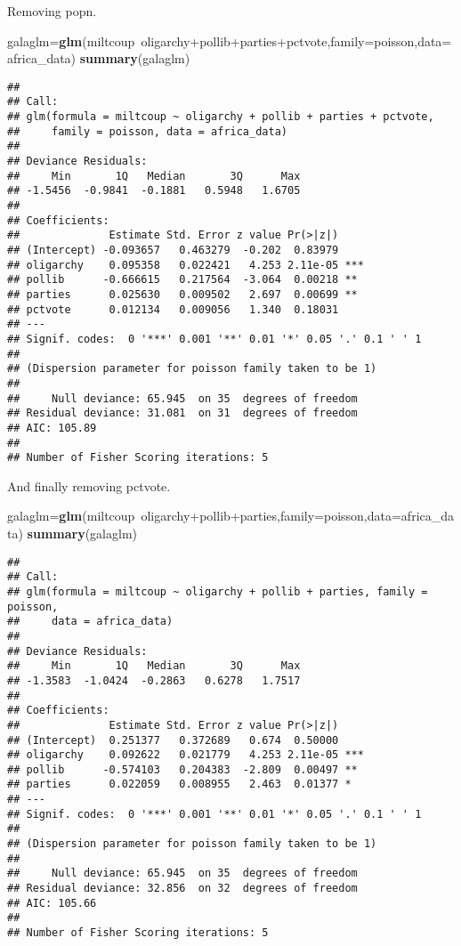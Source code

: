 \documentclass[11pt,]{article}
\newenvironment{Shaded}{\begin{snugshade}}{\end{snugshade}}
\newcommand{\KeywordTok}[1]{\textcolor[rgb]{0.13,0.29,0.53}{\textbf{{#1}}}}
\newcommand{\DataTypeTok}[1]{\textcolor[rgb]{0.13,0.29,0.53}{{#1}}}
\newcommand{\NormalTok}[1]{{#1}}
\begin{document}
Removing popn.

\begin{Shaded}
\begin{Highlighting}[]
\NormalTok{galaglm=}\KeywordTok{glm}\NormalTok{(miltcoup~oligarchy+pollib+parties+pctvote,}\DataTypeTok{family=}\NormalTok{poisson,}\DataTypeTok{data=}\NormalTok{africa_data)}
\KeywordTok{summary}\NormalTok{(galaglm)}
\end{Highlighting}
\end{Shaded}

\begin{verbatim}
## 
## Call:
## glm(formula = miltcoup ~ oligarchy + pollib + parties + pctvote, 
##     family = poisson, data = africa_data)
## 
## Deviance Residuals: 
##     Min       1Q   Median       3Q      Max  
## -1.5456  -0.9841  -0.1881   0.5948   1.6705  
## 
## Coefficients:
##              Estimate Std. Error z value Pr(>|z|)    
## (Intercept) -0.093657   0.463279  -0.202  0.83979    
## oligarchy    0.095358   0.022421   4.253 2.11e-05 ***
## pollib      -0.666615   0.217564  -3.064  0.00218 ** 
## parties      0.025630   0.009502   2.697  0.00699 ** 
## pctvote      0.012134   0.009056   1.340  0.18031    
## ---
## Signif. codes:  0 '***' 0.001 '**' 0.01 '*' 0.05 '.' 0.1 ' ' 1
## 
## (Dispersion parameter for poisson family taken to be 1)
## 
##     Null deviance: 65.945  on 35  degrees of freedom
## Residual deviance: 31.081  on 31  degrees of freedom
## AIC: 105.89
## 
## Number of Fisher Scoring iterations: 5
\end{verbatim}

And finally removing pctvote.

\begin{Shaded}
\begin{Highlighting}[]
\NormalTok{galaglm=}\KeywordTok{glm}\NormalTok{(miltcoup~oligarchy+pollib+parties,}\DataTypeTok{family=}\NormalTok{poisson,}\DataTypeTok{data=}\NormalTok{africa_data)}
\KeywordTok{summary}\NormalTok{(galaglm)}
\end{Highlighting}
\end{Shaded}

\begin{verbatim}
## 
## Call:
## glm(formula = miltcoup ~ oligarchy + pollib + parties, family = poisson, 
##     data = africa_data)
## 
## Deviance Residuals: 
##     Min       1Q   Median       3Q      Max  
## -1.3583  -1.0424  -0.2863   0.6278   1.7517  
## 
## Coefficients:
##              Estimate Std. Error z value Pr(>|z|)    
## (Intercept)  0.251377   0.372689   0.674  0.50000    
## oligarchy    0.092622   0.021779   4.253 2.11e-05 ***
## pollib      -0.574103   0.204383  -2.809  0.00497 ** 
## parties      0.022059   0.008955   2.463  0.01377 *  
## ---
## Signif. codes:  0 '***' 0.001 '**' 0.01 '*' 0.05 '.' 0.1 ' ' 1
## 
## (Dispersion parameter for poisson family taken to be 1)
## 
##     Null deviance: 65.945  on 35  degrees of freedom
## Residual deviance: 32.856  on 32  degrees of freedom
## AIC: 105.66
## 
## Number of Fisher Scoring iterations: 5
\end{verbatim}
\end{document}
